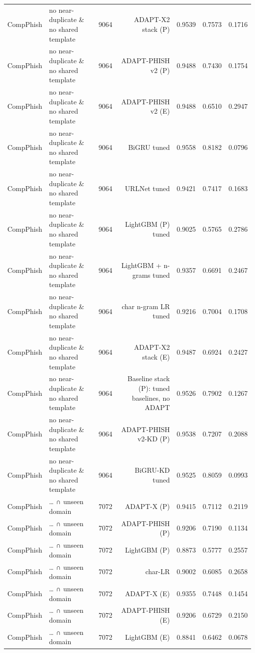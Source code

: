 \begin{table}[t]
\begin{tabular}{llrrrrr}
CompPhish & no near-duplicate \& no shared template & 9064 & ADAPT-X2 stack (P) & 0.9539 & 0.7573 & 0.1716 \\
CompPhish & no near-duplicate \& no shared template & 9064 & ADAPT-PHISH v2 (P) & 0.9488 & 0.7430 & 0.1754 \\
CompPhish & no near-duplicate \& no shared template & 9064 & ADAPT-PHISH v2 (E) & 0.9488 & 0.6510 & 0.2947 \\
CompPhish & no near-duplicate \& no shared template & 9064 & BiGRU tuned & 0.9558 & 0.8182 & 0.0796 \\
CompPhish & no near-duplicate \& no shared template & 9064 & URLNet tuned & 0.9421 & 0.7417 & 0.1683 \\
CompPhish & no near-duplicate \& no shared template & 9064 & LightGBM (P) tuned & 0.9025 & 0.5765 & 0.2786 \\
CompPhish & no near-duplicate \& no shared template & 9064 & LightGBM + n-grams tuned & 0.9357 & 0.6691 & 0.2467 \\
CompPhish & no near-duplicate \& no shared template & 9064 & char n-gram LR tuned & 0.9216 & 0.7004 & 0.1708 \\
CompPhish & no near-duplicate \& no shared template & 9064 & ADAPT-X2 stack (E) & 0.9487 & 0.6924 & 0.2427 \\
CompPhish & no near-duplicate \& no shared template & 9064 & Baseline stack (P): tuned baselines, no ADAPT & 0.9526 & 0.7902 & 0.1267 \\
CompPhish & no near-duplicate \& no shared template & 9064 & ADAPT-PHISH v2-KD (P) & 0.9538 & 0.7207 & 0.2088 \\
CompPhish & no near-duplicate \& no shared template & 9064 & BiGRU-KD tuned & 0.9525 & 0.8059 & 0.0993 \\
CompPhish & … ∩ unseen domain & 7072 & ADAPT-X (P) & 0.9415 & 0.7112 & 0.2119 \\
CompPhish & … ∩ unseen domain & 7072 & ADAPT-PHISH (P) & 0.9206 & 0.7190 & 0.1134 \\
CompPhish & … ∩ unseen domain & 7072 & LightGBM (P) & 0.8873 & 0.5777 & 0.2557 \\
CompPhish & … ∩ unseen domain & 7072 & char-LR & 0.9002 & 0.6085 & 0.2658 \\
CompPhish & … ∩ unseen domain & 7072 & ADAPT-X (E) & 0.9355 & 0.7448 & 0.1454 \\
CompPhish & … ∩ unseen domain & 7072 & ADAPT-PHISH (E) & 0.9206 & 0.6729 & 0.2150 \\
CompPhish & … ∩ unseen domain & 7072 & LightGBM (E) & 0.8841 & 0.6462 & 0.0678 \\

\end{tabular}
\end{table}
